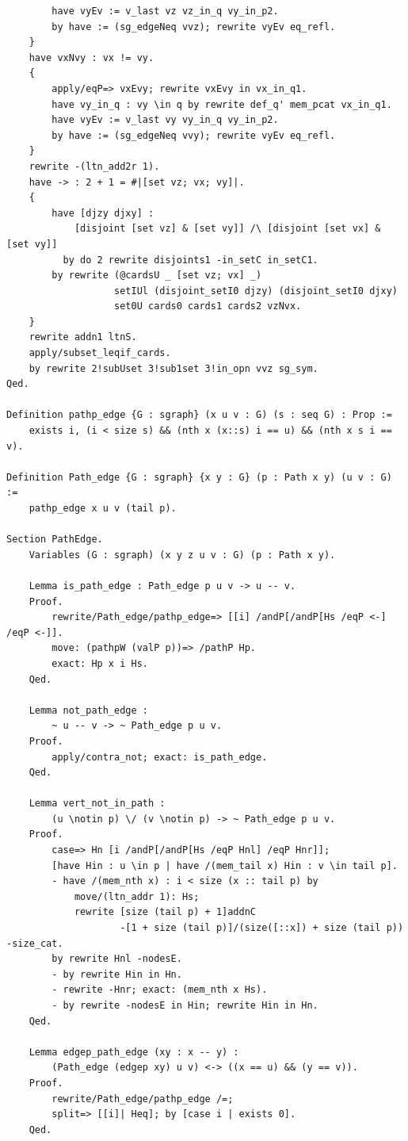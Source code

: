 \begin{verbatim}
        have vyEv := v_last vz vz_in_q vy_in_p2.
        by have := (sg_edgeNeq vvz); rewrite vyEv eq_refl. 
    } 
    have vxNvy : vx != vy.
    {
        apply/eqP=> vxEvy; rewrite vxEvy in vx_in_q1.
        have vy_in_q : vy \in q by rewrite def_q' mem_pcat vx_in_q1.
        have vyEv := v_last vy vy_in_q vy_in_p2.
        by have := (sg_edgeNeq vvy); rewrite vyEv eq_refl. 
    }
    rewrite -(ltn_add2r 1).
    have -> : 2 + 1 = #|[set vz; vx; vy]|.
    {
        have [djzy djxy] : 
            [disjoint [set vz] & [set vy]] /\ [disjoint [set vx] & [set vy]] 
          by do 2 rewrite disjoints1 -in_setC in_setC1. 
        by rewrite (@cardsU _ [set vz; vx] _) 
                   setIUl (disjoint_setI0 djzy) (disjoint_setI0 djxy) 
                   set0U cards0 cards1 cards2 vzNvx.
    }
    rewrite addn1 ltnS.
    apply/subset_leqif_cards.
    by rewrite 2!subUset 3!sub1set 3!in_opn vvz sg_sym.
Qed.

Definition pathp_edge {G : sgraph} (x u v : G) (s : seq G) : Prop :=
    exists i, (i < size s) && (nth x (x::s) i == u) && (nth x s i == v).

Definition Path_edge {G : sgraph} {x y : G} (p : Path x y) (u v : G) :=
    pathp_edge x u v (tail p).

Section PathEdge.
    Variables (G : sgraph) (x y z u v : G) (p : Path x y).

    Lemma is_path_edge : Path_edge p u v -> u -- v.
    Proof.
        rewrite/Path_edge/pathp_edge=> [[i] /andP[/andP[Hs /eqP <-] /eqP <-]].
        move: (pathpW (valP p))=> /pathP Hp.
        exact: Hp x i Hs.
    Qed.

    Lemma not_path_edge :
        ~ u -- v -> ~ Path_edge p u v.
    Proof.
        apply/contra_not; exact: is_path_edge.
    Qed.

    Lemma vert_not_in_path :
        (u \notin p) \/ (v \notin p) -> ~ Path_edge p u v.
    Proof.
        case=> Hn [i /andP[/andP[Hs /eqP Hnl] /eqP Hnr]];
        [have Hin : u \in p | have /(mem_tail x) Hin : v \in tail p].
        - have /(mem_nth x) : i < size (x :: tail p) by
            move/(ltn_addr 1): Hs; 
            rewrite [size (tail p) + 1]addnC 
                    -[1 + size (tail p)]/(size([::x]) + size (tail p)) -size_cat.
        by rewrite Hnl -nodesE.
        - by rewrite Hin in Hn.
        - rewrite -Hnr; exact: (mem_nth x Hs).
        - by rewrite -nodesE in Hin; rewrite Hin in Hn.
    Qed.

    Lemma edgep_path_edge (xy : x -- y) :
        (Path_edge (edgep xy) u v) <-> ((x == u) && (y == v)).
    Proof.
        rewrite/Path_edge/pathp_edge /=;
        split=> [[i]| Heq]; by [case i | exists 0].
    Qed.


\end{verbatim}
